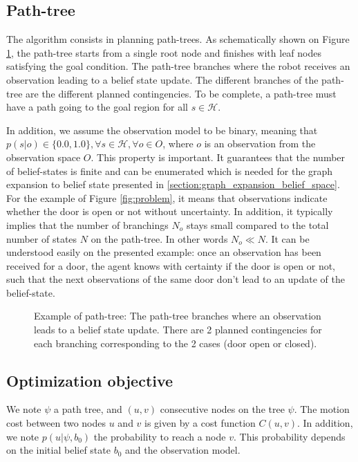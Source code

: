 \documentclass[letterpaper, 10 pt, conference]{ieeeconf}  %
\begin{document}
\subsection{Path-tree}
The algorithm consists in planning path-trees. As schematically shown on Figure \ref{fig:path_tree}, the path-tree starts from a single root node and finishes with leaf nodes satisfying the goal condition. The path-tree branches where the robot receives an observation leading to a belief state update. The different branches of the path-tree are the different planned contingencies. To be complete, a path-tree must have a path going to the goal region for all $s \in \mathcal{H}$.

In addition, we assume the observation model to be binary, meaning that $p(s|o) \in \{0.0, 1.0\}, \forall s \in \mathcal{H}, \forall o \in O$, where $o$ is an observation from the observation space $O$. This property is important. It guarantees that the number of belief-states is finite and can be enumerated which is needed for
the graph expansion to belief state presented in \ref{section:graph_expansion_belief_space}. For the example of Figure \ref{fig:problem}, it means that observations indicate whether the door is open or not without uncertainty. In addition, it typically implies that the number of branchings $N_o$ stays small compared to the total number of states $N$ on the path-tree. In other words $N_o \ll N$. It can be understood easily on the presented example: once an observation has been received for a door, the agent knows with certainty if the door is open or not, such that the next observations of the same door don't lead to an update of the belief-state.

\begin{figure}[!htb]
 \caption{Example of path-tree: The path-tree branches where an observation leads to a belief state update. There are 2 planned contingencies for each branching corresponding to the 2 cases (door open or closed).}
 \label{fig:path_tree}
\end{figure}

\subsection{Optimization objective}
We note $\psi$ a path tree, and $(u, v)$ consecutive nodes on the tree $\psi$. The motion cost between two nodes $u$ and $v$ is given by a cost function $C(u, v)$. In addition, we note $p(u | \psi, b_0)$ the probability to reach a node $v$. This probability depends on the initial belief state $b_0$ and the observation model. 
\end{document}
